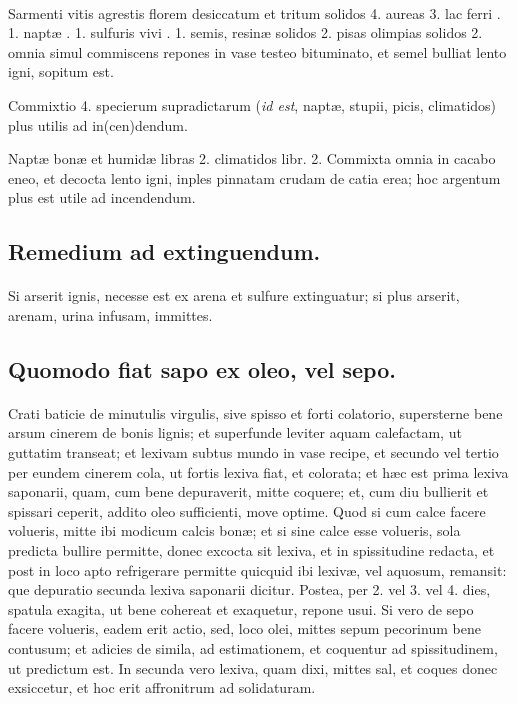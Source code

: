 \documentclass[a4paper, 11pt, oneside, polutonikogreek, italian]{article}
\begin{document}
\paragraph{}
Sarmenti vitis agrestis florem desiccatum et tritum solidos 4. aureas 3. lac ferri \roundz. 1. naptæ \roundz. 1. sulfuris vivi \roundz. 1. semis, resinæ solidos 2. pisas olimpias solidos 2. omnia simul commiscens repones in vase testeo bituminato, et semel bulliat lento igni, sopitum est.

Commixtio 4. specierum supradictarum (\emph{id est}, naptæ, stupii, picis, climatidos) plus utilis ad in(cen)dendum.

Naptæ bonæ et humidæ libras 2. climatidos libr. 2. Commixta omnia in cacabo eneo, et decocta lento igni, inples pinnatam crudam de catia erea; hoc argentum plus est utile ad incendendum.

\subsection{Remedium ad extinguendum.}
\paragraph{}
Si arserit ignis, necesse est ex arena et sulfure extinguatur; si plus arserit, arenam, urina infusam, immittes.

\subsection{Quomodo fiat sapo ex oleo, vel sepo.}
\paragraph{}
Crati baticie de minutulis virgulis, sive spisso et forti colatorio, supersterne bene arsum cinerem de bonis lignis; et superfunde leviter aquam calefactam, ut guttatim transeat; et lexivam subtus mundo in vase recipe, et secundo vel tertio per eundem cinerem cola, ut fortis lexiva fiat, et colorata; et hæc est prima lexiva saponarii, quam, cum bene depuraverit, mitte coquere; et, cum diu bullierit et spissari ceperit, addito oleo sufficienti, move optime. Quod si cum calce facere volueris, mitte ibi modicum calcis bonæ; et si sine calce esse volueris, sola predicta bullire permitte, donec excocta sit lexiva, et in spissitudine redacta, et post in loco apto refrigerare permitte quicquid ibi lexivæ, vel aquosum, remansit: que depuratio secunda lexiva saponarii dicitur. Postea, per 2. vel 3. vel 4. dies, spatula exagita, ut bene cohereat et exaquetur, repone usui. Si vero de sepo facere volueris, eadem erit actio, sed, loco olei, mittes sepum pecorinum bene contusum; et adicies de simila, ad estimationem, et coquentur ad spissitudinem, ut predictum est. In secunda vero lexiva, quam dixi, mittes sal, et coques donec exsiccetur, et hoc erit affronitrum ad solidaturam.
\end{document}
